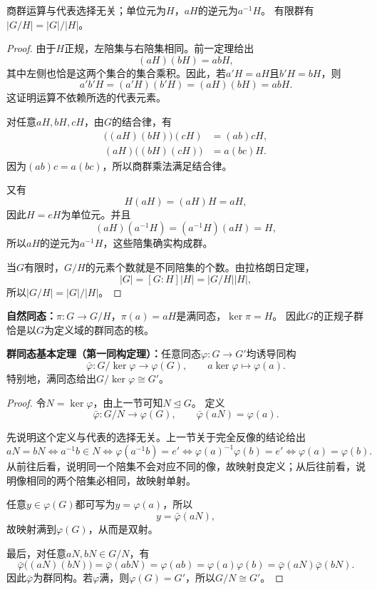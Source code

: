 \begin{proposition}
商群运算与代表选择无关；单位元为$H$，$aH$的逆元为$a^{-1}H$。
有限群有$|G/H|=|G|/|H|$。
\end{proposition}
\begin{proof}
由于$H$正规，左陪集与右陪集相同。前一定理给出
\[
(aH)(bH)=abH,
\]
其中左侧也恰是这两个集合的集合乘积。因此，若$a'H=aH$且$b'H=bH$，则
\[
a'b'H=(a'H)(b'H)=(aH)(bH)=abH.
\]
这证明运算不依赖所选的代表元素。

对任意$aH,bH,cH$，由$G$的结合律，有
\[
\begin{aligned}
\bigl((aH)(bH)\bigr)(cH)&=(ab)cH,\\
(aH)\bigl((bH)(cH)\bigr)&=a(bc)H.
\end{aligned}
\]
因为$(ab)c=a(bc)$，所以商群乘法满足结合律。

又有
\[
H(aH)=(aH)H=aH,
\]
因此$H=eH$为单位元。并且
\[
(aH)(a^{-1}H)=(a^{-1}H)(aH)=H,
\]
所以$aH$的逆元为$a^{-1}H$，这些陪集确实构成群。

当$G$有限时，$G/H$的元素个数就是不同陪集的个数。由拉格朗日定理，
\[
|G|=[G:H]|H|=|G/H||H|,
\]
所以$|G/H|=|G|/|H|$。
\end{proof}

\begin{definition}
\textbf{自然同态：}$\pi:G\to G/H$，$\pi(a)=aH$是满同态，$\ker\pi=H$。
因此$G$的正规子群恰是以$G$为定义域的群同态的核。
\end{definition}
\begin{theorem}\label{p2:group-first-iso}
\textbf{群同态基本定理（第一同构定理）：}任意同态$\varphi:G\to G'$均诱导同构
\[
\bar\varphi:G/\ker\varphi\longrightarrow\varphi(G),\qquad
a\ker\varphi\longmapsto\varphi(a).
\]
特别地，满同态给出$G/\ker\varphi\cong G'$。
\end{theorem}
\begin{proof}
令$N=\ker\varphi$，由上一节可知$N\trianglelefteq G$。
定义
\[
\bar\varphi:G/N\longrightarrow\varphi(G),\qquad
\bar\varphi(aN)=\varphi(a).
\]

先说明这个定义与代表的选择无关。上一节关于完全反像的结论给出
\[aN=bN\iff a^{-1}b\in N\iff\varphi(a^{-1}b)=e'\iff\varphi(a)^{-1}\varphi(b)=e'\iff\varphi(a)=\varphi(b).\]
从前往后看，说明同一个陪集不会对应不同的像，故映射良定义；从后往前看，说明像相同的两个陪集必相同，故映射单射。

任意$y\in\varphi(G)$都可写为$y=\varphi(a)$，所以
\[
y=\bar\varphi(aN),
\]
故映射满到$\varphi(G)$，从而是双射。

最后，对任意$aN,bN\in G/N$，有
\[\bar\varphi\bigl((aN)(bN)\bigr)=\bar\varphi(abN)=\varphi(ab)=\varphi(a)\varphi(b)=\bar\varphi(aN)\bar\varphi(bN).\]
因此$\bar\varphi$为群同构。若$\varphi$满，则$\varphi(G)=G'$，所以$G/N\cong G'$。
\end{proof}

